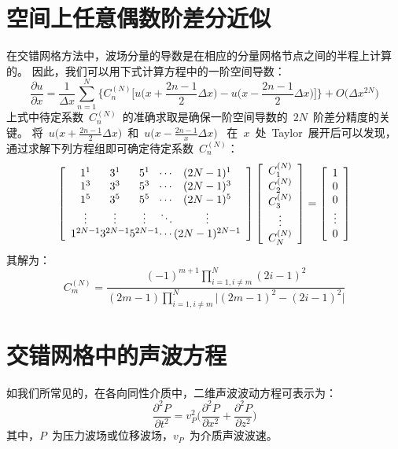 \documentclass[UTF8]{ctexart}
\begin{document}
\section{空间上任意偶数阶差分近似}
在交错网格方法中，波场分量的导数是在相应的分量网格节点之间的半程上计算的。
因此，我们可以用下式计算方程中的一阶空间导数：
\begin{equation}\label{eq:dudx}
\frac{\partial u}{\partial x}=\frac{1}{\Delta x}\sum_{n=1}^N\Big\{C_n^{(N)}\big[u\big(x+\frac{2n-1}{2}\Delta x\big)-u\big(x-\frac{2n-1}{2}\Delta x\big)\big]\Big\}+O\big(\Delta x^{2N}\big)
\end{equation}
上式中待定系数~$C_n^{(N)}$~的准确求取是确保一阶空间导数的~$2N$~阶差分精度的关键。
将~$u\big(x+\frac{2n-1}{2}\Delta x\big)$~和~$u\big(x-\frac{2n-1}{x}\Delta x\big)$~
在~$x$~处~Taylor~展开后可以发现，通过求解下列方程组即可确定待定系数~$C_n^{(N)}$：
\[ \left[ \begin{array}{c@{}c@{}c@{}c@{}c}
1^1      & 3^1      & 5^1      & \cdots & (2N-1)^1      \\
1^3      & 3^3      & 5^3      & \cdots & (2N-1)^3      \\
1^5      & 3^5      & 5^5      & \cdots & (2N-1)^5      \\
\vdots   & \vdots   & \vdots   & \ddots & \vdots        \\
1^{2N-1} & 3^{2N-1} & 5^{2N-1} & \cdots & (2N-1)^{2N-1}
\end{array}\right]
\left[\begin{array}{c}
C_1^{(N)} \\
C_2^{(N)} \\
C_3^{(N)} \\
\vdots    \\
C_N^{(N)} \\
\end{array}\right]=
\left[\begin{array}{c}
1      \\
0      \\
0      \\
\vdots \\
0      \\
\end{array} \right] \]
其解为：
\begin{equation}
C_m^{(N)}=\frac{(-1)^{m+1}\prod\limits_{i=1,i\neq m}^N(2i-1)^2}{(2m-1)\prod\limits_{i=1,i\neq m}^N\big|(2m-1)^2-(2i-1)^2\big|}
\end{equation}

\section{交错网格中的声波方程}
如我们所常见的，在各向同性介质中，二维声波波动方程可表示为：
\begin{equation}\label{eq:awave}
\frac{\partial^2 P}{\partial t^2}=v_P^2\Big(\frac{\partial^2 P}{\partial x^2}+\frac{\partial^2 P}{\partial z^2}\Big)
\end{equation}
其中，$P$~为压力波场或位移波场，$v_P$~为介质声波波速。
\end{document}
